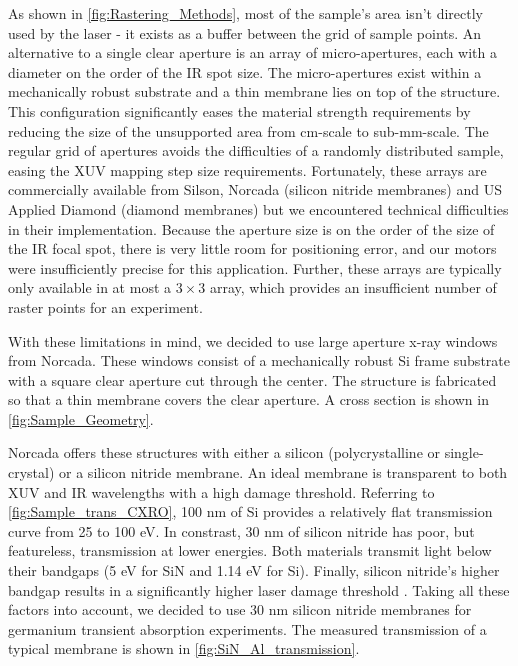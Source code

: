 As shown in \cref{fig:Rastering_Methods}, most of the sample's area isn't directly used by the laser - it exists as a buffer between the grid of sample points. An alternative to a single clear aperture is an array of micro-apertures, each with a diameter on the order of the IR spot size. The micro-apertures exist within a mechanically robust substrate and a thin membrane lies on top of the structure. This configuration significantly eases the material strength requirements by reducing the size of the unsupported area from cm-scale to sub-mm-scale. The regular grid of apertures avoids the difficulties of a randomly distributed sample, easing the XUV mapping step size requirements. Fortunately, these arrays are commercially available from Silson, Norcada (silicon nitride membranes) and US Applied Diamond (diamond membranes) but we encountered technical difficulties in their implementation. Because the aperture size is on the order of the size of the IR focal spot, there is very little room for positioning error, and our motors were insufficiently precise for this application. Further, these arrays are typically only available in at most a $3\times3$ array, which provides an insufficient number of raster points for an experiment.

With these limitations in mind, we decided to use large aperture x-ray windows from Norcada. These windows consist of a mechanically robust Si frame substrate with a square clear aperture cut through the center. The structure is fabricated so that a thin membrane covers the clear aperture. A cross section is shown in \cref{fig:Sample_Geometry}.

Norcada offers these structures with either a silicon (polycrystalline or single-crystal) or a silicon nitride membrane. An ideal membrane is transparent to both XUV and IR wavelengths with a high damage threshold. Referring to \cref{fig:Sample_trans_CXRO}, 100 nm of Si provides a relatively flat transmission curve from 25 to 100 eV. In constrast, 30 nm of silicon nitride has poor, but featureless, transmission at lower energies. Both materials transmit light below their bandgaps (5 eV for SiN and 1.14 eV for Si). Finally, silicon nitride's higher bandgap results in a significantly higher laser damage threshold \cite{gamalyAblationSolidsFemtosecond2002, austinFemtosecondLaserDamage2018, keldyshIonizationFieldStrong1965}. Taking all these factors into account, we decided to use 30 nm silicon nitride membranes for germanium transient absorption experiments. The measured transmission of a typical membrane is shown in \cref{fig:SiN_Al_transmission}.

